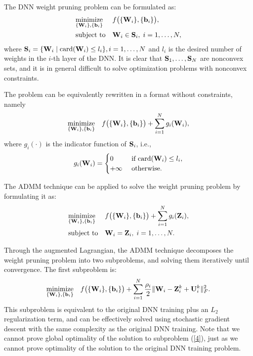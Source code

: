 \documentclass{article} %
\begin{document}
The DNN weight pruning problem can be formulated as:
\begin{equation}
\begin{aligned}
& \underset{ \{{\bf{W}}_{i}\},\{{\bf{b}}_{i} \}}{\text{minimize}}
& & f \big( \{{\bf{W}}_{i} \}, \{{\bf{b}}_{i} \} \big),
\\ & \text{subject to}
& & {\bf{W}}_{i}\in {\bf{S}}_{i}, \; i = 1, \ldots, N,
\end{aligned}
\end{equation}
where ${\bf{S}}_{i}= \{{\bf{W}}_i\mid \mathrm{card}({\bf{W}}_i)\le l_{i}  \}, i=1,\dots,N$ and $l_{i}$ is the desired number of weights in the $i$-th layer of the DNN. It is clear that ${\bf{S}}_{1},\dots,{\bf{S}}_{N}$ are nonconvex sets, and it is in general difficult to solve optimization problems with nonconvex constraints. 

The problem can be equivalently rewritten in a format without constraints, namely
\begin{equation}
 \underset{ \{{\bf{W}}_{i}\},\{{\bf{b}}_{i} \}}{\text{minimize}}
\ \ \ f \big( \{{\bf{W}}_{i} \}, \{{\bf{b}}_{i} \} \big)+\sum_{i=1}^{N} g_{i}({\bf{W}}_{i}), 
\end{equation}
where $g_{i}(\cdot)$ is the indicator function of ${\bf{S}}_{i}$, i.e.,
\begin{eqnarray}g_{i}({\bf{W}}_{i})=
\begin{cases}
 0 & \text { if } \mathrm{card}({\bf{W}}_{i})\le l_{i}, \\ 
 +\infty & \text { otherwise. }
\end{cases}
\end{eqnarray}

The ADMM technique \citep{boyd2011} can be applied to solve the weight pruning problem by formulating it as:
\begin{equation*}
\begin{aligned}
& \underset{ \{{\bf{W}}_{i}\},\{{\bf{b}}_{i} \}}{\text{minimize}}
& & f \big( \{{\bf{W}}_{i} \}, \{{\bf{b}}_{i} \} \big)+\sum_{i=1}^{N} g_{i}({\bf{Z}}_{i}),
\\ & \text{subject to}
& & {\bf{W}}_{i}={\bf{Z}}_{i}, \; i = 1, \ldots, N.
\end{aligned}
\end{equation*}

Through the augmented Lagrangian, the ADMM technique decomposes the weight pruning problem into two subproblems, and solving them iteratively until convergence. The first subproblem is:
\begin{equation}
\label{4}
 \underset{ \{{\bf{W}}_{i}\},\{{\bf{b}}_{i} \}}{\text{minimize}}
\ \ \ f \big( \{{\bf{W}}_{i} \}, \{{\bf{b}}_{i} \} \big)+\sum_{i=1}^{N} \frac{\rho_{i}}{2}  \| {\bf{W}}_{i}-{\bf{Z}}_{i}^{k}+{\bf{U}}_{i}^{k} \|_{F}^{2}. \\
\end{equation}
This subproblem is equivalent to the original DNN training plus an $L_2$ regularization term, and can be effectively solved using stochastic gradient descent with the same complexity as the original DNN training.
Note that we cannot prove global optimality of the solution to subproblem (\ref{4}), just as we cannot prove optimality of the solution to the original DNN training problem.
\end{document}
